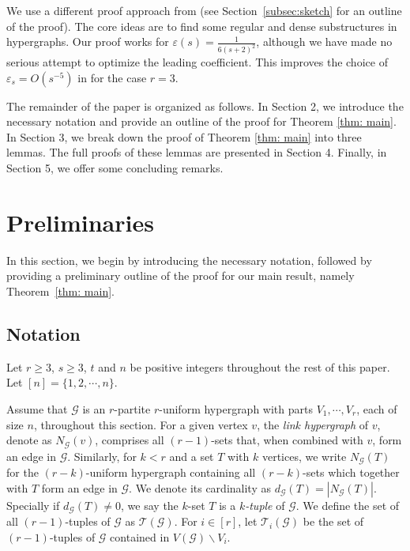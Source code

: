 \documentclass[11pt]{article}
\begin{document}
We use a different proof approach from \cite{BGJS23} (see Section~\ref{subsec:sketch} for an outline of the proof).
The core ideas are to find some regular and dense substructures in hypergraphs.  
Our proof works for $\varepsilon(s)= \frac{1}{6(s+2)^2}$, although we have made no serious attempt to optimize the leading coefficient.
This improves the choice of $\varepsilon_s=O(s^{-5})$ in \cite{BGJS23} for the case $r=3$.

\medskip

The remainder of the paper is organized as follows.
In Section 2, we introduce the necessary notation and provide an outline of the proof for Theorem \ref{thm: main}.
In Section 3, we break down the proof of Theorem \ref{thm: main} into three lemmas.
The full proofs of these lemmas are presented in Section 4.
Finally, in Section 5, we offer some concluding remarks.


\section{Preliminaries}
In this section, we begin by introducing the necessary notation, followed by providing a preliminary outline of the proof for our main result, namely Theorem~\ref{thm: main}.

\subsection{Notation}
Let $r\ge 3$, $s\ge 3$, $t$ and $n$ be positive integers throughout the rest of this paper. Let $[n]=\{1,2,\cdots,n\}$.

Assume that $\mathcal G$ is an $r$-partite $r$-uniform hypergraph with parts $V_1, \cdots , V_r$, each of size $n$, throughout this section.
For a given vertex $v$, the {\it link hypergraph} of $v$, denote as $N_{\mathcal G}(v) $, comprises all $(r-1)$-sets that, when combined with $v$, form an edge in $\mathcal G$.
Similarly, for $k<r$ and a set $T$ with $k$ vertices, we write $N_{\mathcal G}(T)$ for the $(r-k)$-uniform hypergraph containing all $(r-k)$-sets which together with $T$ form an edge in $\mathcal G$.
We denote its cardinality as $d_{\mathcal G}(T)=| N_{\mathcal G}(T)|$.
Specially if $ d_{\mathcal G}(T)\neq 0$, we say the $k$-set $T$ is a {\it $k$-tuple} of $\mathcal G$.
We define the set of all $(r-1)$-tuples of $\mathcal G$ as $\mathcal T(\mathcal G)$.
For $i\in [r]$, let $\mathcal T_i(\mathcal G)$ be the set of $(r-1)$-tuples of $\mathcal G$ contained in $V(\mathcal G)\backslash V_i$.
\end{document}
